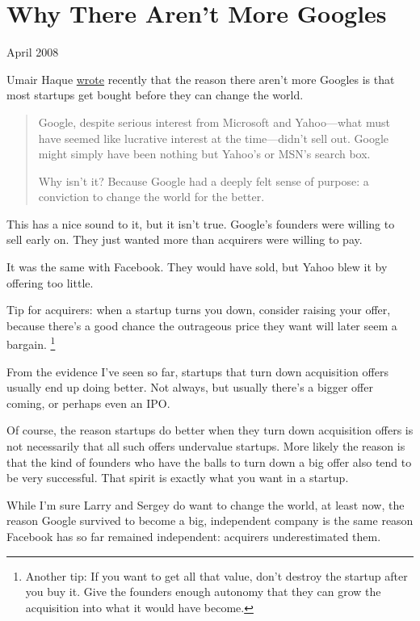 \documentclass[12pt]{book}
\begin{document}
\chapter{Why There Aren't More Googles}

April 2008

Umair Haque
\href{http://discussionleader.hbsp.com/haque/2008/04/i_agree_and_i.html}{wrote}
recently that the reason there aren't more Googles is that most startups
get bought before they can change the world.

\begin{quote}
Google, despite serious interest from Microsoft and Yahoo---what must
have seemed like lucrative interest at the time---didn't sell out.
Google might simply have been nothing but Yahoo's or MSN's search box.

Why isn't it? Because Google had a deeply felt sense of purpose: a
conviction to change the world for the better.
\end{quote}

This has a nice sound to it, but it isn't true. Google's founders were
willing to sell early on. They just wanted more than acquirers were
willing to pay.

It was the same with Facebook. They would have sold, but Yahoo blew it
by offering too little.

Tip for acquirers: when a startup turns you down, consider raising your
offer, because there's a good chance the outrageous price they want will
later seem a bargain. \footnote{Another tip: If you want to get all that value, don't destroy
the startup after you buy it. Give the founders enough autonomy that
they can grow the acquisition into what it would have become.}

From the evidence I've seen so far, startups that turn down acquisition
offers usually end up doing better. Not always, but usually there's a
bigger offer coming, or perhaps even an IPO.

Of course, the reason startups do better when they turn down acquisition
offers is not necessarily that all such offers undervalue startups. More
likely the reason is that the kind of founders who have the balls to
turn down a big offer also tend to be very successful. That spirit is
exactly what you want in a startup.

While I'm sure Larry and Sergey do want to change the world, at least
now, the reason Google survived to become a big, independent company is
the same reason Facebook has so far remained independent: acquirers
underestimated them.
\end{document}
